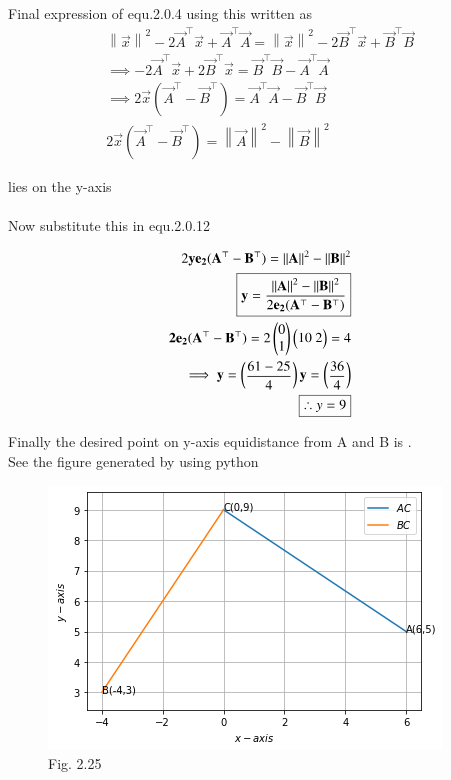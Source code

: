 \documentclass[journal,12pt,twocolumn]{IEEEtran}
\newcommand{\norm}[1]{\left\lVert#1\right\rVert}
\begin{document}
Final expression of equ.2.0.4 using this written as 
\begin{align}
\boxed{\norm{\vec{x}}^2-2 \vec{A}^{\top} \vec{x}+\vec{A}^{\top} \vec{A}=\norm{\vec{x}}^2-2 \vec{B}^{\top} \vec{x}+\vec{B}^{\top} \vec{B}}\\
\implies-2 \vec{A}^{\top} \vec{x}+2 \vec{B}^{\top} \vec{x}= \vec{B}^{\top} \vec{B}-\vec{A}^{\top} \vec{A}\\
\implies 2 \vec{x}(\vec{A}^{\top}-\vec{B}^{\top})= \vec{A}^{\top} \vec{A}-\vec{B}^{\top} \vec{B}\\
2 \vec{x}(\vec{A}^{\top}-\vec{B}^{\top})=\norm{\vec{A}}^2-\norm{\vec{B}}^2
\end{align}

 lies on the y-axis\\
\\
Now substitute this in equ.2.0.12

\begin{align}
2\vec{ye_2}(\vec{A}^{\top}-\vec{B}^{\top})=\norm{\vec{A}}^2-\norm{\vec{B}}^2\\
\boxed{\vec{y} = \frac{\norm{\vec{A}}^2 - \norm{\vec{B}}^2}{2\vec{e_2}(\vec{A}^{\top} - \vec{B}^{\top})}}\\
\vec{2e_2}(\vec{A}^{\top}-\vec{B}^{\top})=2\myvec{0\\1}\myvec{10\ 2}=4\\
\implies\vec{y}=\myvec{\dfrac{61-25}{4}}
\vec{y}=\myvec{\dfrac{36}{4}}\\
 \boxed{\therefore y=9}
\end{align}




Finally the desired point on y-axis equidistance from A and B is .
 \\
 See the figure generated by using python
     
\begin{figure}[ht]
    \centering
    \includegraphics[width=\columnwidth]{download.png}
    \caption{Fig. 2.25}
    \label{Graphical solution}
\end{figure}
\end{document}
